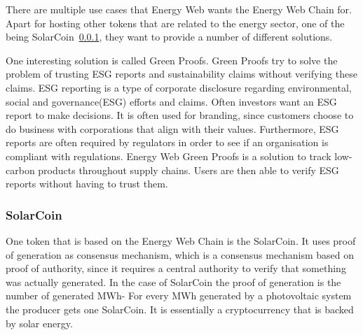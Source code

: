 There are multiple use cases that Energy Web wants the Energy Web Chain for.
Apart for hosting other tokens that are related to the energy sector, one of the being SolarCoin\ \ref{subsubsec:solarcoin}, they want to provide a number of different solutions.

One interesting solution is called Green Proofs.
Green Proofs try to solve the problem of trusting ESG reports and sustainability claims without verifying these claims.
ESG reporting is a type of corporate disclosure regarding environmental, social and governance(ESG) efforts and claims.
Often investors want an ESG report to make decisions.
It is often used for branding, since customers choose to do business with corporations that align with their values.
Furthermore, ESG reports are often required by regulators in order to see if an organisation is compliant with regulations.
Energy Web Green Proofs is a solution to track low-carbon products throughout supply chains.
Users are then able to verify ESG reports without having to trust them.\cite{ESG-reporting, EW-green-proofs}

\subsubsection{SolarCoin}\label{subsubsec:solarcoin}
One token that is based on the Energy Web Chain is the SolarCoin.
It uses proof of generation as consensus mechanism, which is a consensus mechanism based on proof of authority, since it requires a central authority to verify that something was actually generated.
In the case of SolarCoin the proof of generation is the number of generated MWh-
For every MWh generated by a photovoltaic system the producer gets one SolarCoin.
It is essentially a cryptocurrency that is backed by solar energy.\cite{solarcoin-save-the-planet}